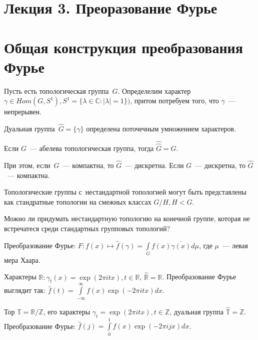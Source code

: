 \documentclass{article}
\begin{document}
\section*{Лекция 3. Преоразование Фурье}
\resetcntrs

\section{Общая конструкция преобразования Фурье}

Пусть есть топологическая группа~$G$. Определелим характер~$\gamma \in Hom(G,
S^1), S^1 = \{\lambda \in \mathbb{C} : |\lambda| = 1\})$, притом потребуем того,
что $\gamma$~--- непрерывен.

\begin{definition}
	Дуальная группа~$\hat G = \{\gamma\}$ определена поточечным умножением
	характеров.
\end{definition}

\begin{theorem}
Если $G$~--- абелева топологическая группа, тогда $\hat{\hat{G}} = G$.

При этом, если~$G$~--- компактна, то $\hat G$~--- дискретна. Если $G$~---
дискретна, то $\hat G$~--- компактна.
\end{theorem}

Топологические группы с~нестандартной топологией могут быть представлены как
стандратные топологии на смежных классах $G/H, H < G$.

\begin{exercise}
	Можно ли придумать нестандартную топологию на конечной группе, которая не
	встречатеся среди стандартных групповых топологий?
\end{exercise}

\begin{definition}
	Преобразование Фурье: $F: f(x) \mapsto \hat f(\gamma) = \int\limits_G
	f(x)\overline{\gamma(x)} d\mu$, где $\mu$~--- левая мера Хаара.
\end{definition}

Характеры $\mathbb{R}: \gamma_t(x) = \exp(2\pi itx), t \in \mathbb{R}$,
$\hat{\mathbb{R}} = \mathbb{R}$. Преобразование Фурье выглядит так:
$\hat f(t) = \int\limits_{-\infty}^{\infty} f(x) \exp(-2\pi itx) dx$.

Тор $\mathbb{T} = \mathbb{R} / \mathbb{Z}$, его характеры $\gamma_t = \exp(2\pi
itx), t \in \mathbb{Z}$, дуальная группа $\hat{\mathbb{T}} = \mathbb{Z}$.
Преобразование Фурье: $\hat f(j) = \int\limits_0^1 f(x) \exp(-2\pi ijx) dx$.
\end{document}

